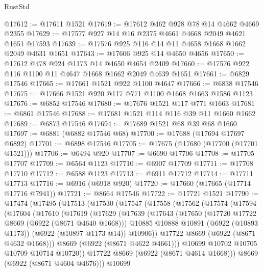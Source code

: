 \begin{lexlean}{RustStd}
\begin{coremodule}
@17612 := @17611 @1521
@17619 := @17612 @462 @928 @78 @14 @4662 @4669 @2355
@17629 := @17577 @927 @14 @16 @2375 @4661 @4668 @2049 @4621 @1651 @17593
@17639 := @17576 @925 @116 @14 @11 @4658 @1668 @1662 @2049 @4631 @1651
@17643 := @17606 @925 @14 @4650 @4656
@17650 := @17612 @478 @924 @1173 @14 @4650 @4654 @2409
@17660 := @17576 @922 @116 @1100 @11 @4647 @1668 @1662 @2049 @4639 @1651
@17661 := @6829 @17546
@17665 := @17661 @1521 @922 @1100 @4647
@17666 := @6838 @17546
@17675 := @17666 @1521 @920 @117 @771 @1100 @1668 @1663 @1586 @1123
@17676 := @6852 @17546
@17680 := @17676 @1521 @117 @771 @1663
@17681 := @6861 @17546
@17688 := @17681 @1521 @114 @116 @39 @11 @1660 @1662
@17689 := @6873 @17546
@17694 := @17689 @1521 @68 @39 @68 @1660
@17697 := @6881 (@6882 @17546 @68)
@17700 := @17688 (@17694 @17697 @6892)
@17701 := @6898 @17546
@17705 := @17675 (@17680 (@17700 (@17701 @1521)))
@17706 := @6494 @920
@17707 := @6690 @17706
@17708 := @17705 @17707
@17709 := @6564 @1123
@17710 := @6907 @17709
@17711 := @17708 @17710
@17712 := @6588 @1123
@17713 := @6911 @17712
@17714 := @17711 @17713
@17716 := @6916 (@6918 @920)
@17720 := @17660 (@17665 (@17714 @17716 @7941))
@17721 := @8664 @17546
@17722 := @17721 @1521
@17790 := @17474
    (@17495
      (@17513
        (@17530
          (@17547
            (@17558
              (@17562
                (@17574
                  (@17594
                    (@17604
                      (@17610
                        (@17619
                          (@17629
                            (@17639
                              (@17643
                                (@17650
                                  (@17720 @17722 @8669 (@6922 (@8671 @4640 @1668)))
                                  @10885
                                  @10888
                                  @10891
                                  (@6922 (@10893 @1173))
                                  (@6922 (@10897 @1173 @14))
                                  @10906))
                              @17722
                              @8669
                              (@6922 (@8671 @4632 @1668)))
                            @8669
                            (@6922 (@8671 @4622 @4661)))
                          @10699
                          @10702
                          @10705
                          @10709
                          @10714
                          @10720))
                      @17722
                      @8669
                      (@6922 (@8671 @4614 @1668)))
                    @8669
                    (@6922 (@8671 @4604 @4676)))
                  @10699

\end{coremodule}
\end{lexlean}
